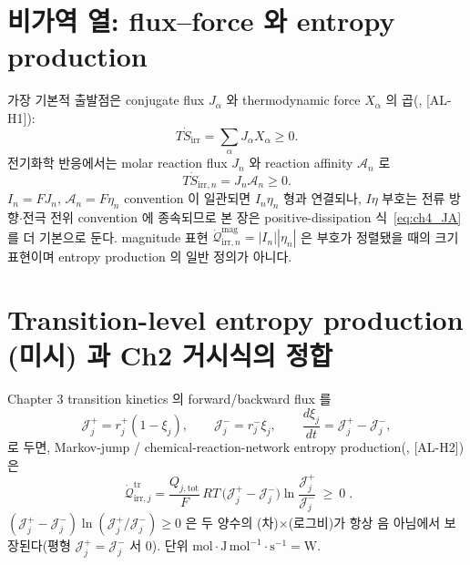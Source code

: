 \documentclass[11pt,a4paper]{article}
\newcommand{\tot}{\mathrm{tot}}
\newcommand{\irr}{\mathrm{irr}}
\newcommand{\tr}{\mathrm{tr}}
\newcommand{\AL}[1]{\textsf{[AL-#1]}}
\begin{document}
\section{비가역 열: flux--force 와 entropy production}\label{sec:ch4_irr}
가장 기본적 출발점은 conjugate flux $J_\alpha$ 와 thermodynamic force $X_\alpha$ 의 곱(\cite{degrootmazur1962,onsager1931,prigogine1967}, \AL{H1}):
\begin{equation}
T\dot S_{\irr}=\sum_\alpha J_\alpha X_\alpha\ge0.
\label{eq:ch4_fluxforce}
\end{equation}
전기화학 반응에서는 molar reaction flux $J_n$ 와 reaction affinity $\mathcal A_n$ 로
\begin{equation}
T\dot S_{\irr,n}=J_n\mathcal A_n\ge0.
\label{eq:ch4_JA}
\end{equation}
$I_n=FJ_n$, $\mathcal A_n=F\eta_n$ convention 이 일관되면 $I_n\eta_n$ 형과 연결되나, $I\eta$ 부호는 전류
방향$\cdot$전극 전위 convention 에 종속되므로 본 장은 positive-dissipation 식~\eqref{eq:ch4_JA} 를 더 기본으로
둔다. magnitude 표현 $\dot{\mathcal Q}_{\irr,n}^{\mathrm{mag}}=|I_n||\eta_n|$ 은 부호가 정렬됐을 때의 크기
표현이며 entropy production 의 일반 정의가 아니다.

\section{Transition-level entropy production (미시) 과 Ch2 거시식의 정합}\label{sec:ch4_tr}
Chapter 3 transition kinetics 의 forward/backward flux 를
\begin{equation}
\mathcal J_j^+=r_j^+(1-\xi_j),\qquad \mathcal J_j^-=r_j^-\xi_j,\qquad \frac{d\xi_j}{dt}=\mathcal J_j^+-\mathcal J_j^-,
\label{eq:ch4_Jpm}
\end{equation}
로 두면, Markov-jump / chemical-reaction-network entropy production(\cite{schnakenberg1976,prigogine1967}, \AL{H2})은
\begin{equation}
\boxed{\;\dot{\mathcal Q}_{\irr,j}^{\tr}=\frac{Q_{j,\tot}}{F}\,RT\,\big(\mathcal J_j^+-\mathcal J_j^-\big)\ln\!\frac{\mathcal J_j^+}{\mathcal J_j^-}\ \ge\ 0\;.}
\label{eq:ch4_tr_entropy}
\end{equation}
$(\mathcal J_j^+-\mathcal J_j^-)\ln(\mathcal J_j^+/\mathcal J_j^-)\ge0$ 은 두 양수의 (차)$\times$(로그비)가 항상
음 아님에서 보장된다(평형 $\mathcal J_j^+=\mathcal J_j^-$ 서 $0$). 단위 $\mathrm{mol}\cdot\mathrm{J\,mol^{-1}}\cdot\mathrm{s^{-1}}=\mathrm W$.
\end{document}
